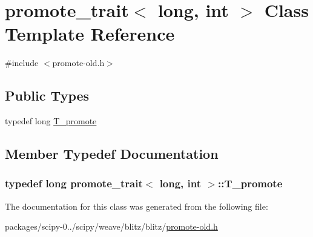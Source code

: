 \hypertarget{classpromote__trait_3_01long_00_01int_01_4}{}\section{promote\+\_\+trait$<$ long, int $>$ Class Template Reference}
\label{classpromote__trait_3_01long_00_01int_01_4}


{\ttfamily \#include $<$promote-\/old.\+h$>$}

\subsection*{Public Types}
\begin{DoxyCompactItemize}
\item 
typedef long \hyperlink{classpromote__trait_3_01long_00_01int_01_4_a965b4cb39154f87d6331b134f4ad9af0}{T\+\_\+promote}
\end{DoxyCompactItemize}


\subsection{Member Typedef Documentation}
\hypertarget{classpromote__trait_3_01long_00_01int_01_4_a965b4cb39154f87d6331b134f4ad9af0}{}
\subsubsection[{T\+\_\+promote}]{\setlength{\rightskip}{0pt plus 5cm}typedef long {\bf promote\+\_\+trait}$<$ long, int $>$\+::{\bf T\+\_\+promote}}\label{classpromote__trait_3_01long_00_01int_01_4_a965b4cb39154f87d6331b134f4ad9af0}


The documentation for this class was generated from the following file\+:\begin{DoxyCompactItemize}
\item 
packages/scipy-\/0../scipy/weave/blitz/blitz/\hyperlink{promote-old_8h}{promote-\/old.\+h}\end{DoxyCompactItemize}
